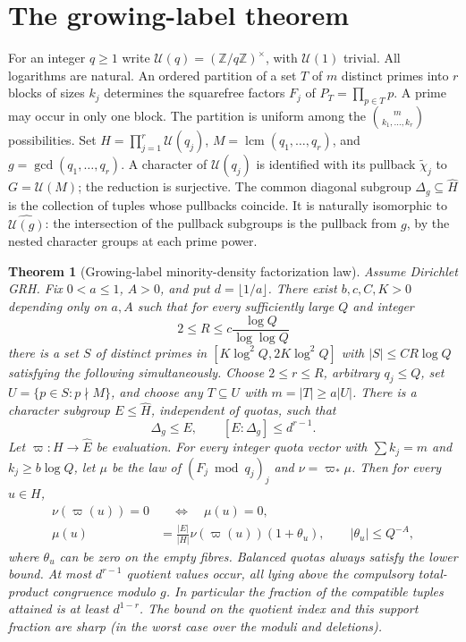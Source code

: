 \documentclass[11pt]{article}
\newtheorem{theorem}{Theorem}[section]
\theoremstyle{remark}\newtheorem{remark}[theorem]{Remark}
\newcommand{\U}{\mathcal U}
\newcommand{\abs}[1]{\left|#1\right|}
\newcommand{\GCD}{\operatorname{gcd}}
\newcommand{\LCM}{\operatorname{lcm}}
\begin{document}
\section{The growing-label theorem}
For an integer $q\ge1$ write $\U(q)=(\mathbb Z/q\mathbb Z)^\times$, with $\U(1)$ trivial. All logarithms are natural. An ordered partition of a set $T$ of $m$ distinct primes into $r$ blocks of sizes $k_j$ determines the squarefree factors $F_j$ of $P_T=\prod_{p\in T}p$. A prime may occur in only one block. The partition is uniform among the $\binom{m}{k_1,\ldots,k_r}$ possibilities. Set $H=\prod_{j=1}^r\U(q_j)$, $M=\LCM(q_1,\ldots,q_r)$, and $g=\GCD(q_1,\ldots,q_r)$. A character of $\U(q_j)$ is identified with its pullback $\widetilde\chi_j$ to $G=\U(M)$; the reduction is surjective. The common diagonal subgroup $\Delta_g\subseteq\widehat H$ is the collection of tuples whose pullbacks coincide. It is naturally isomorphic to $\widehat{\U(g)}$: the intersection of the pullback subgroups is the pullback from $g$, by the nested character groups at each prime power.

\begin{theorem}[Growing-label minority-density factorization law]\label{thm:main}
Assume Dirichlet GRH. Fix $0<a\le1$, $A>0$, and put $d=\lfloor1/a\rfloor$. There exist $b,c,C,K>0$ depending only on $a,A$ such that for every sufficiently large $Q$ and integer
\[
2\le R\le c\frac{\log Q}{\log\log Q}
\]
there is a set $S$ of distinct primes in $[K\log^2Q,2K\log^2Q]$ with $\abs S\le CR\log Q$ satisfying the following simultaneously. Choose $2\le r\le R$, arbitrary $q_j\le Q$, set $U=\{p\in S:p\nmid M\}$, and choose any $T\subseteq U$ with $m=\abs T\ge a\abs U$. There is a character subgroup $E\le\widehat H$, independent of quotas, such that
\[
\Delta_g\le E,\qquad [E:\Delta_g]\le d^{r-1}.
\]
Let $\varpi:H\to\widehat E$ be evaluation. For every integer quota vector with $\sum k_j=m$ and $k_j\ge b\log Q$, let $\mu$ be the law of $(F_j\bmod q_j)_j$ and $\nu=\varpi_*\mu$. Then for every $u\in H$,
\begin{align}
\nu(\varpi(u))=0&\quad\Longleftrightarrow\quad \mu(u)=0,\label{eq:supp}\\
\mu(u)&=\frac{\abs E}{\abs H}\nu(\varpi(u))(1+\theta_u),\qquad \abs{\theta_u}\le Q^{-A},\label{eq:law}
\end{align}
where $\theta_u$ can be zero on the empty fibres. Balanced quotas always satisfy the lower bound. At most $d^{r-1}$ quotient values occur, all lying above the compulsory total-product congruence modulo $g$. In particular the fraction of the compatible tuples attained is at least $d^{1-r}$. The bound on the quotient index and this support fraction are sharp (in the worst case over the moduli and deletions).
\end{theorem}
\end{document}
